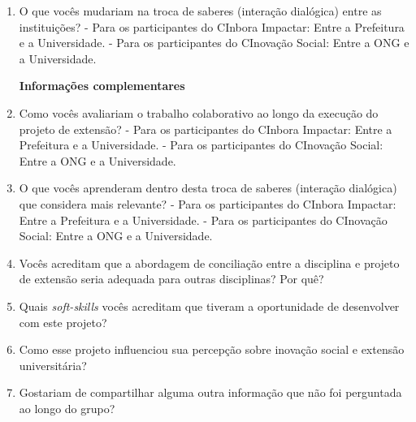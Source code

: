 \begin{enumerate}
    \item O que vocês mudariam na troca de saberes (interação dialógica) entre as instituições?  
    - Para os participantes do CInbora Impactar: Entre a Prefeitura e a Universidade.
    - Para os participantes do CInovação Social: Entre a \gls{ONG} e a Universidade.
\par\vspace{1\baselineskip}
\textbf{Informações complementares}
    \item Como vocês avaliariam o trabalho colaborativo ao longo da execução do projeto de extensão?
     - Para os participantes do CInbora Impactar: Entre a Prefeitura e a Universidade.
    - Para os participantes do CInovação Social: Entre a \gls{ONG} e a Universidade.
    \item O que vocês aprenderam dentro desta troca de saberes (interação dialógica) que considera mais relevante?  
     - Para os participantes do CInbora Impactar: Entre a Prefeitura e a Universidade.
    - Para os participantes do CInovação Social: Entre a \gls{ONG} e a Universidade.
    \item Vocês acreditam que a abordagem de conciliação entre a disciplina e projeto de extensão seria adequada para outras disciplinas? Por quê? 
    \item Quais \textit{soft-skills} vocês acreditam que tiveram a oportunidade de desenvolver com este projeto?
    \item Como esse projeto influenciou sua percepção sobre inovação social e extensão universitária? 
    \item Gostariam de compartilhar alguma outra informação que não foi perguntada ao longo do grupo?  
\end{enumerate}
\par\vspace{1\baselineskip}
